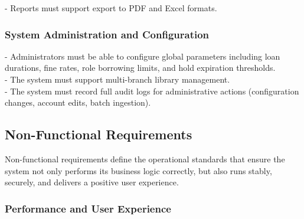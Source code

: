 - Reports must support export to PDF and Excel formats.\\



\subsubsection{System Administration and Configuration}

- Administrators must be able to configure global parameters including loan durations, fine rates, role borrowing limits, and hold expiration thresholds.\\

- The system must support multi-branch library management.\\

- The system must record full audit logs for administrative actions (configuration changes, account edits, batch ingestion).\\



\subsection{Non-Functional Requirements}



Non-functional requirements define the operational standards that ensure the system not only performs its business logic correctly, but also runs stably, securely, and delivers a positive user experience.



\subsubsection{Performance and User Experience}




